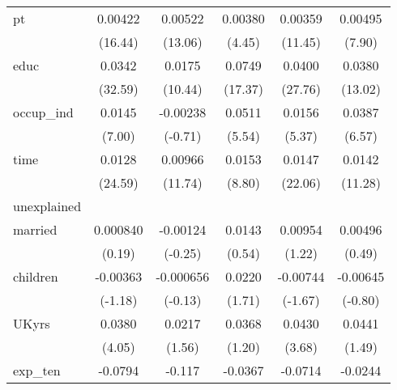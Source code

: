 {\begin{longtable}{l*{5}{c}}
pt          &     0.00422\sym{***}&     0.00522\sym{***}&     0.00380\sym{***}&     0.00359\sym{***}&     0.00495\sym{***}\\
            &     (16.44)         &     (13.06)         &      (4.45)         &     (11.45)         &      (7.90)         \\
educ        &      0.0342\sym{***}&      0.0175\sym{***}&      0.0749\sym{***}&      0.0400\sym{***}&      0.0380\sym{***}\\
            &     (32.59)         &     (10.44)         &     (17.37)         &     (27.76)         &     (13.02)         \\
occup\_ind   &      0.0145\sym{***}&    -0.00238         &      0.0511\sym{***}&      0.0156\sym{***}&      0.0387\sym{***}\\
            &      (7.00)         &     (-0.71)         &      (5.54)         &      (5.37)         &      (6.57)         \\
time        &      0.0128\sym{***}&     0.00966\sym{***}&      0.0153\sym{***}&      0.0147\sym{***}&      0.0142\sym{***}\\
            &     (24.59)         &     (11.74)         &      (8.80)         &     (22.06)         &     (11.28)         \\
\hline
unexplained &                     &                     &                     &                     &                     \\
married     &    0.000840         &    -0.00124         &      0.0143         &     0.00954         &     0.00496         \\
            &      (0.19)         &     (-0.25)         &      (0.54)         &      (1.22)         &      (0.49)         \\
children    &    -0.00363         &   -0.000656         &      0.0220         &    -0.00744         &    -0.00645         \\
            &     (-1.18)         &     (-0.13)         &      (1.71)         &     (-1.67)         &     (-0.80)         \\
UKyrs       &      0.0380\sym{***}&      0.0217         &      0.0368         &      0.0430\sym{***}&      0.0441         \\
            &      (4.05)         &      (1.56)         &      (1.20)         &      (3.68)         &      (1.49)         \\
exp\_ten     &     -0.0794\sym{***}&      -0.117\sym{***}&     -0.0367         &     -0.0714\sym{***}&     -0.0244         \\

\end{longtable}}
